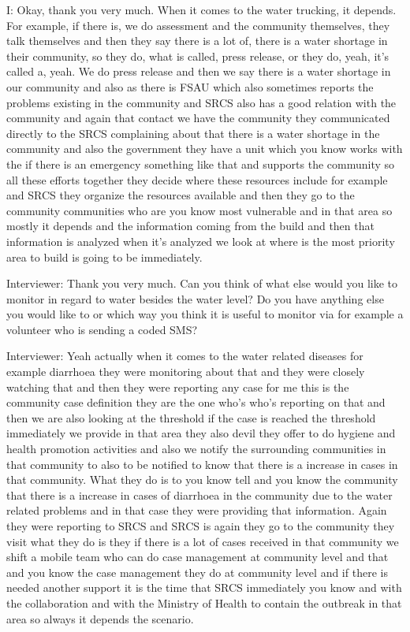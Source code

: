 I: Okay, thank you very much. When it comes to the water trucking, it depends. For example, if there is, we do assessment and the community themselves, they talk themselves and then they say there is a lot of, there is a water shortage in their community, so they do, what is called, press release, or they do, yeah, it's called a, yeah. We do press release and then we say there is a water shortage in our community and also as there is FSAU which also sometimes reports the problems existing in the community and SRCS also has a good relation with the community and again that contact we have the community they communicated directly to the SRCS complaining about that there is a water shortage in the community and also the government they have a unit which you know works with the if there is an emergency something like that and supports the community so all these efforts together they decide where these resources include for example and SRCS they organize the resources available and then they go to the community communities who are you know most vulnerable and in that area so mostly it depends and the information coming from the build and then that information is analyzed when it's analyzed we look at where is the most priority area to build is going to be immediately. 

Interviewer:  Thank you very much. Can you think of what else would you like to monitor in regard to water besides the water level? Do you have anything else you would like to or which way you think it is useful to monitor via for example a volunteer who is sending a coded SMS? 

Interviewer:  Yeah actually when it comes to the water related diseases for example diarrhoea they were monitoring about that and they were closely watching that and then they were reporting any case for me this is the community case definition they are the one who's who's reporting on that and then we are also looking at the threshold if the case is reached the threshold immediately we provide in that area they also devil they offer to do hygiene and health promotion activities and also we notify the surrounding communities in that community to also to be notified to know that there is a increase in cases in that community. What they do is to you know tell and you know the community that there is a increase in cases of diarrhoea in the community due to the water related problems and in that case they were providing that information. Again they were reporting to SRCS and SRCS is again they go to the community they visit what they do is they if there is a lot of cases received in that community we shift a mobile team who can do case management at community level and that and you know the case management they do at community level and if there is needed another support it is the time that SRCS immediately you know and with the collaboration and with the Ministry of Health to contain the outbreak in that area so always it depends the scenario. 


